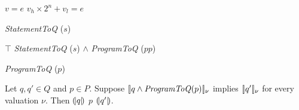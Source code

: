 
\begin{algorithm}
  \begin{algorithmic}[1]
        \Return $v = e$
      \EndCase
        \Return $v_h \times 2^n + v_l = e$
      \EndCase
    \EndMatch
  \end{algorithmic}
  \caption{\textit{StatementToQ} ($s$)}
\end{algorithm}

\begin{algorithm}
  \begin{algorithmic}[1]
      \Case{$\epsilon$} \Return $\top$ \EndCase
        \Return \textit{StatementToQ} ($s$) $\wedge$
                \textit{ProgramToQ} ($pp$)
      \EndCase
    \EndMatch
  \end{algorithmic}
  \caption{\textit{ProgramToQ} ($p$)}
\end{algorithm}

\begin{theorem}
  Let $q, q' \in Q$ and $p \in P$.
  Suppose $[\!|{q \wedge \textmd{\textit{ProgramToQ}}(p)}|\!]_\nu$
  implies $[\!|{q'}|\!]_\nu$ for every valuation $\nu$. 
  Then ${(\!|}{q}{|\!)}$ $p$ ${(\!|}{q'}{|\!)}$.
\end{theorem}

